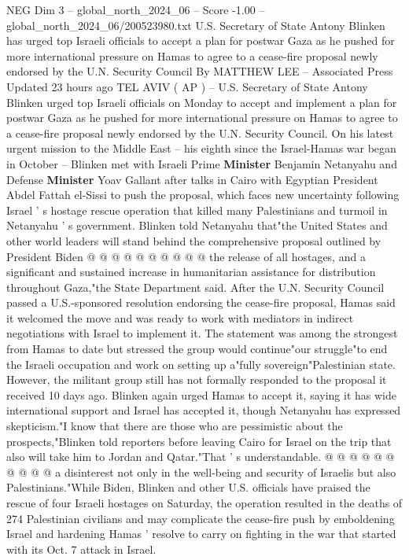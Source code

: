 \begin{textsample}{NEG Dim 3 – global\_north\_2024\_06 – Score -1.00 – global\_north\_2024\_06/200523980.txt}  \label{ex:f3_neg_396}
U.S.
Secretary of State Antony Blinken has urged top Israeli officials to accept a plan for postwar Gaza as he pushed for more international pressure on Hamas to agree to a cease-fire proposal newly endorsed by the U.N.
Security Council By MATTHEW LEE -- Associated Press Updated 23 hours ago TEL AVIV ( AP ) -- U.S.
Secretary of State Antony Blinken urged top Israeli officials on Monday to accept and implement a plan for postwar Gaza as he pushed for more international pressure on Hamas to agree to a cease-fire proposal newly endorsed by the U.N.
Security Council.
On his latest urgent mission to the Middle East -- his eighth since the Israel-Hamas war began in October -- Blinken met with Israeli Prime \textbf{Minister} Benjamin Netanyahu and Defense \textbf{Minister} Yoav Gallant after talks in Cairo with Egyptian President Abdel Fattah el-Sissi to push the proposal, which faces new uncertainty following Israel ' s hostage rescue operation that killed many Palestinians and turmoil in Netanyahu ' s government.
Blinken told Netanyahu that"the United States and other world leaders will stand behind the comprehensive proposal outlined by President Biden @ @ @ @ @ @ @ @ @ @ the release of all hostages, and a significant and sustained increase in humanitarian assistance for distribution throughout Gaza,"the State Department said.
After the U.N.
Security Council passed a U.S.-sponsored resolution endorsing the cease-fire proposal, Hamas said it welcomed the move and was ready to work with mediators in indirect negotiations with Israel to implement it.
The statement was among the strongest from Hamas to date but stressed the group would continue"our struggle"to end the Israeli occupation and work on setting up a"fully sovereign"Palestinian state.
However, the militant group still has not formally responded to the proposal it received 10 days ago.
Blinken again urged Hamas to accept it, saying it has wide international support and Israel has accepted it, though Netanyahu has expressed skepticism."I know that there are those who are pessimistic about the prospects,"Blinken told reporters before leaving Cairo for Israel on the trip that also will take him to Jordan and Qatar."That ' s understandable. @ @ @ @ @ @ @ @ @ @ a disinterest not only in the well-being and security of Israelis but also Palestinians."While Biden, Blinken and other U.S. officials have praised the rescue of four Israeli hostages on Saturday, the operation resulted in the deaths of 274 Palestinian civilians and may complicate the cease-fire push by emboldening Israel and hardening Hamas ' resolve to carry on fighting in the war that started with its Oct. 7 attack in Israel.

\end{textsample}
